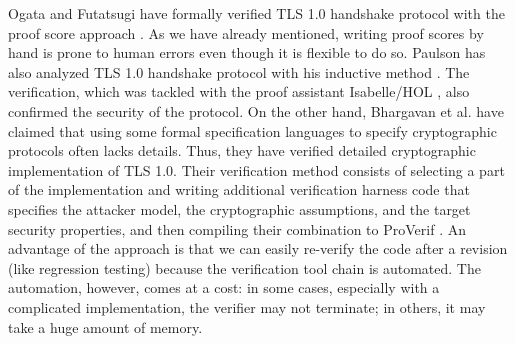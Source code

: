 \documentclass[a4paper,fleqn]{cas-dc}
\begin{document}
Ogata and Futatsugi \cite{ogata05} have formally verified TLS 1.0 handshake protocol  with the proof score approach \cite{OgataF03fmoods}.
As we have already mentioned, writing proof scores by hand is prone to human errors even though it is flexible to do so.
Paulson \cite{Paulson99} has also analyzed TLS 1.0 handshake protocol  with his inductive method \cite{Paulson98}.
The verification, which was tackled with the proof assistant Isabelle/HOL \cite{NipkowPW02}, also confirmed the security of the protocol.
On the other hand,
Bhargavan et al. \cite{BhargavanFCZ12} have claimed that using some formal specification languages to specify cryptographic protocols often lacks details.
Thus, they have verified detailed cryptographic implementation of TLS 1.0.
Their verification method consists of selecting a part of the implementation and writing additional verification harness code that specifies the attacker model, the cryptographic
assumptions, and the target security properties, and then compiling their combination to ProVerif \cite{proverif}. 
An advantage of the approach is that we can easily re-verify the code after a revision (like regression testing) because the verification tool chain is automated.
The automation, however, comes at a cost: in some cases, especially with a complicated implementation,
the verifier may not terminate; in others, it may take a huge amount of memory.


\end{document}
